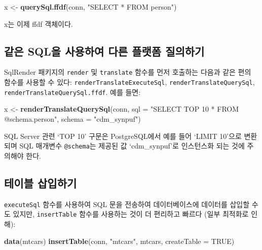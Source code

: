 \documentclass[10.5pt]{book}
\newenvironment{Shaded}{\begin{snugshade}}{\end{snugshade}}
\newcommand{\KeywordTok}[1]{\textcolor[rgb]{0.13,0.29,0.53}{\textbf{#1}}}
\newcommand{\DataTypeTok}[1]{\textcolor[rgb]{0.13,0.29,0.53}{#1}}
\newcommand{\StringTok}[1]{\textcolor[rgb]{0.31,0.60,0.02}{#1}}
\newcommand{\OtherTok}[1]{\textcolor[rgb]{0.56,0.35,0.01}{#1}}
\newcommand{\NormalTok}[1]{#1}
\theoremstyle{definition}
\theoremstyle{definition}
\theoremstyle{definition}
\theoremstyle{remark}
\begin{document}
\begin{Shaded}
\begin{Highlighting}[]
\NormalTok{x <-}\StringTok{ }\KeywordTok{querySql.ffdf}\NormalTok{(conn, }\StringTok{"SELECT * FROM person"}\NormalTok{)}
\end{Highlighting}
\end{Shaded}

x는 이제 ffdf 객체이다.

\subsection{같은 SQL을 사용하여 다른 플랫폼 질의하기}\label{-sql----}

SqlRender 패키지의 \texttt{render} 및 \texttt{translate} 함수를 먼저
호출하는 다음과 같은 편의 함수를 사용할 수 있다:
\texttt{renderTranslateExecuteSql}, \texttt{renderTranslateQuerySql},
\texttt{renderTranslateQuerySql.ffdf}. 예를 들면:

\begin{Shaded}
\begin{Highlighting}[]
\NormalTok{x <-}\StringTok{ }\KeywordTok{renderTranslateQuerySql}\NormalTok{(conn, }
                             \DataTypeTok{sql =} \StringTok{"SELECT TOP 10 * FROM @schema.person"}\NormalTok{,}
                             \DataTypeTok{schema =} \StringTok{"cdm_synpuf"}\NormalTok{)}
\end{Highlighting}
\end{Shaded}

SQL Server 관련 `TOP 10' 구문은 PostgreSQL에서 예를 들어 `LIMIT 10'으로
변환되며 SQL 매개변수 \texttt{@schema}는 제공된 값 `cdm\_synpuf'로
인스턴스화 되는 것에 주의해야 한다.

\subsection{테이블 삽입하기}\label{-}

\texttt{executeSql} 함수를 사용하여 SQL 문을 전송하여 데이터베이스에
데이터를 삽입할 수도 있지만, \texttt{insertTable} 함수를 사용하는 것이
더 편리하고 빠르다 (일부 최적화로 인해):

\begin{Shaded}
\begin{Highlighting}[]
\KeywordTok{data}\NormalTok{(mtcars)}
\KeywordTok{insertTable}\NormalTok{(conn, }\StringTok{"mtcars"}\NormalTok{, mtcars, }\DataTypeTok{createTable =} \OtherTok{TRUE}\NormalTok{)}
\end{Highlighting}
\end{Shaded}
\end{document}
